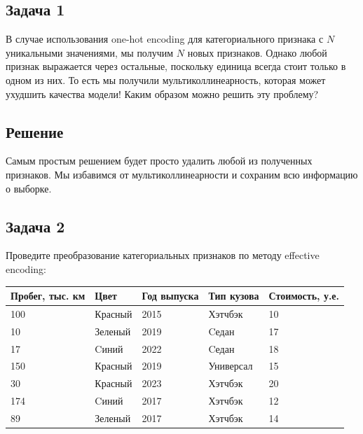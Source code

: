 \subsection*{Задача 1}

В случае использования one-hot encoding для категориального признака с $N$ уникальными значениями, мы получим $N$ новых признаков. Однако любой признак выражается через остальные, поскольку единица всегда стоит только в одном из них. То есть мы получили мультиколлинеарность, которая может ухудшить качества модели! Каким образом можно решить эту проблему?

\subsection*{Решение}

Самым простым решением будет просто удалить любой из полученных признаков. Мы избавимся от мультиколлинеарности и сохраним всю информацию о выборке.

\subsection*{Задача 2}

Проведите преобразование категориальных признаков по методу effective encoding:
\begin{table}[ht]
    \footnotesize
    \begin{tabular}{lllll}
        \hline
        Пробег, тыс. км & Цвет    & Год выпуска & Тип кузова & Стоимость, у.е. \\ \hline
        100             & Красный & 2015        & Хэтчбэк    & 10              \\
        10              & Зеленый & 2019        & Cедан      & 17              \\
        17              & Cиний   & 2022        & Cедан      & 18              \\
        150             & Красный & 2019        & Универсал  & 15              \\
        30              & Красный & 2023        & Хэтчбэк    & 20              \\
        174             & Cиний   & 2017        & Хэтчбэк    & 12              \\
        89              & Зеленый & 2017        & Хэтчбэк    & 14              \\ \hline
    \end{tabular}
\end{table}

